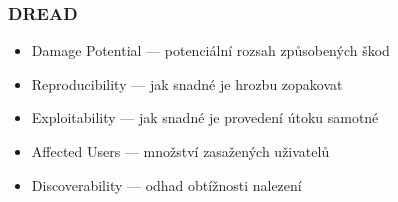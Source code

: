 \subsubsection*{DREAD}
\begin{itemize}
    \item Damage Potential --- potenciální rozsah způsobených škod
    \item Reproducibility --- jak snadné je hrozbu zopakovat
    \item Exploitability --- jak snadné je provedení útoku samotné
    \item Affected Users --- množství zasažených uživatelů
    \item Discoverability --- odhad obtížnosti nalezení
\end{itemize}